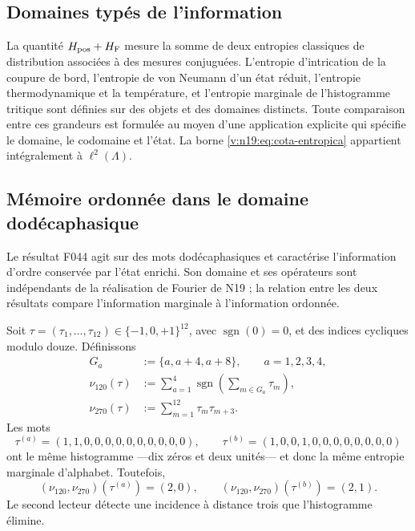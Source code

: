 \subsection{Domaines typés de l’information}
\label{v:n19:sec:tipos-entropia}

La quantité \(H_{\rm pos}+H_{\rm F}\) mesure la somme de deux entropies
classiques de distribution associées à des mesures conjuguées. L’entropie
d’intrication de la coupure de bord, l’entropie de von Neumann d’un
état réduit, l’entropie thermodynamique et la température, et l’entropie
marginale de l’histogramme tritique sont définies sur des objets et des domaines
distincts. Toute comparaison entre ces grandeurs est formulée au moyen d’une
application explicite qui spécifie le domaine, le codomaine et l’état. La borne
\eqref{v:n19:eq:cota-entropica} appartient intégralement à
\(\ell^2(\Lambda)\).

\subsection{Mémoire ordonnée dans le domaine dodécaphasique}
\label{v:n19:sec:memoria-ordenada}

Le résultat F044 agit sur des mots dodécaphasiques et caractérise
l’information d’ordre conservée par l’état enrichi. Son domaine et
ses opérateurs sont indépendants de la réalisation de Fourier de N19 ;
la relation entre les deux résultats compare l’information marginale à
l’information ordonnée.

Soit \(\tau=(\tau_1,\ldots,\tau_{12})\in\{-1,0,+1\}^{12}\), avec
\(\operatorname{sgn}(0)=0\), et des indices cycliques modulo douze. Définissons
\begin{align}
 G_a&:=\{a,a+4,a+8\},\qquad a=1,2,3,4,\nonumber\\
 \nu_{120}(\tau)&:=\sum_{a=1}^4
   \operatorname{sgn}\!\left(\sum_{m\in G_a}\tau_m\right),
 \label{v:n19:eq:nu120}\\
 \nu_{270}(\tau)&:=\sum_{m=1}^{12}\tau_m\tau_{m+3}.
 \label{v:n19:eq:nu270}
\end{align}
Les mots
\begin{equation}
 \tau^{(a)}=(1,1,0,0,0,0,0,0,0,0,0,0),\qquad
 \tau^{(b)}=(1,0,0,1,0,0,0,0,0,0,0,0)
 \label{v:n19:eq:testigos-orden}
\end{equation}
ont le même histogramme ---dix zéros et deux unités--- et donc
la même entropie marginale d’alphabet. Toutefois,
\begin{equation}
 (\nu_{120},\nu_{270})(\tau^{(a)})=(2,0),\qquad
 (\nu_{120},\nu_{270})(\tau^{(b)})=(2,1).
 \label{v:n19:eq:testigos-lectura}
\end{equation}
Le second lecteur détecte une incidence à distance trois que
l’histogramme élimine.


